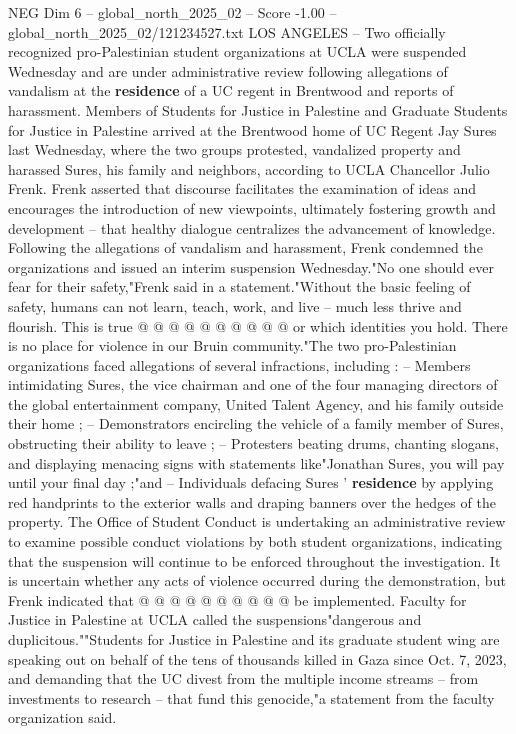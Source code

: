 \begin{textsample}{NEG Dim 6 – global\_north\_2025\_02 – Score -1.00 – global\_north\_2025\_02/121234527.txt}  \label{ex:f6_neg_112}
LOS ANGELES -- Two officially recognized pro-Palestinian student organizations at UCLA were suspended Wednesday and are under administrative review following allegations of vandalism at the \textbf{residence} of a UC regent in Brentwood and reports of harassment.
Members of Students for Justice in Palestine and Graduate Students for Justice in Palestine arrived at the Brentwood home of UC Regent Jay Sures last Wednesday, where the two groups protested, vandalized property and harassed Sures, his family and neighbors, according to UCLA Chancellor Julio Frenk.
Frenk asserted that discourse facilitates the examination of ideas and encourages the introduction of new viewpoints, ultimately fostering growth and development -- that healthy dialogue centralizes the advancement of knowledge.
Following the allegations of vandalism and harassment, Frenk condemned the organizations and issued an interim suspension Wednesday."No one should ever fear for their safety,"Frenk said in a statement."Without the basic feeling of safety, humans can not learn, teach, work, and live -- much less thrive and flourish.
This is true @ @ @ @ @ @ @ @ @ @ or which identities you hold.
There is no place for violence in our Bruin community."The two pro-Palestinian organizations faced allegations of several infractions, including : -- Members intimidating Sures, the vice chairman and one of the four managing directors of the global entertainment company, United Talent Agency, and his family outside their home ; -- Demonstrators encircling the vehicle of a family member of Sures, obstructing their ability to leave ; -- Protesters beating drums, chanting slogans, and displaying menacing signs with statements like"Jonathan Sures, you will pay until your final day ;"and -- Individuals defacing Sures ' \textbf{residence} by applying red handprints to the exterior walls and draping banners over the hedges of the property.
The Office of Student Conduct is undertaking an administrative review to examine possible conduct violations by both student organizations, indicating that the suspension will continue to be enforced throughout the investigation.
It is uncertain whether any acts of violence occurred during the demonstration, but Frenk indicated that @ @ @ @ @ @ @ @ @ @ be implemented.
Faculty for Justice in Palestine at UCLA called the suspensions"dangerous and duplicitous.""Students for Justice in Palestine and its graduate student wing are speaking out on behalf of the tens of thousands killed in Gaza since Oct. 7, 2023, and demanding that the UC divest from the multiple income streams -- from investments to research -- that fund this genocide,"a statement from the faculty organization said.

\end{textsample}
